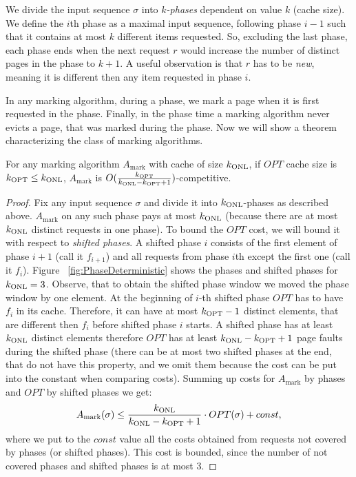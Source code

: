 We divide the input sequence $\sigma$ into $k$\textit{-phases} dependent on value $k$ 
(cache size). We define the $i$th phase as a maximal input sequence, following 
phase $i-1$ such that it contains at most $k$ different items requested. So, 
excluding the last phase, each phase ends when the next request $r$ would 
increase the number of distinct pages in the phase to $k+1$. A useful observation is 
that $r$ has to be \textit{new}, meaning it is different then any item requested 
in phase $i$.


In any marking algorithm, during a phase, we mark a page when it is first 
requested in the phase. Finally, in the phase time a marking algorithm
never evicts a page, that was marked during the phase. Now we will show a theorem 
characterizing the class of marking algorithms.
\begin{theorem}\cite{torng}
For any marking algorithm $A_{\mathrm{mark}}$ with cache of size 
$k_{\mathrm{ONL}}$, if $OPT$ 
cache size is $k_{\mathrm{OPT}} \leq k_{\mathrm{ONL}}$, $A_{\mathrm{mark}}$ is 
$O(\frac{k_{\mathrm{OPT}}}{k_{\mathrm{ONL}}-k_{\mathrm{OPT}}+1})$-competitive.
\end{theorem}
\begin{proof}
Fix any input sequence $\sigma$ and divide it into $k_{\mathrm{ONL}}$-phases as described 
above. $A_{\mathrm{mark}}$ on any such phase pays at most $k_{\mathrm{ONL}}$ (because there are 
at most 
$k_{\mathrm{ONL}}$ distinct requests in one phase). To bound the $OPT$ cost, we will bound it with 
respect to \textit{shifted phases}. A shifted phase $i$ consists 
of the first element of phase $i+1$ (call it $f_{i+1}$) and all requests from phase 
$i$th except the first one (call it $f_i$). Figure 
~\ref{fig:PhaseDeterministic} shows the phases and shifted phases for $k_{\mathrm{ONL}}=3$. Observe, 
that to obtain the shifted phase window we moved the phase window by one element. At 
the beginning of $i$-th shifted phase $OPT$ has to have $f_i$ in its cache. 
Therefore, it can have at most $k_{\mathrm{OPT}}-1$ distinct elements, that are different then $f_i$ before shifted phase $i$ starts. 
A shifted phase has at least $k_{\mathrm{ONL}}$ distinct elements therefore $OPT$ has at least 
$k_{\mathrm{ONL}}-k_{\mathrm{OPT}}+1$ page faults during the shifted phase (there can be at most two shifted 
phases at the end, that do not have this property, and we omit them because the cost can be put 
into the constant when comparing costs).
Summing up costs for $A_{\mathrm{mark}}$ by phases and $OPT$ by shifted phases 
we get:
$$ A_{\mathrm{mark}}(\sigma) \leq \frac{k_{\mathrm{ONL}}}{k_{\mathrm{ONL}}-k_{\mathrm{OPT}}+1} \cdot OPT(\sigma) + const,$$
where we put to the $const$ value all the costs obtained from requests not covered by phases (or 
shifted phases). This cost is bounded, since the number of not covered phases and shifted phases is at most 3.
\end{proof}
